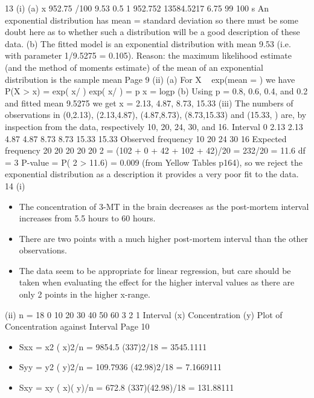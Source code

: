 \documentclass[a4paper,12pt]{article}
\begin{document}
13 (i) (a) x 952.75 /100 9.53
0.5
1 952.752
13584.5217 6.75
99 100
s
An exponential distribution has mean = standard deviation so there
must be some doubt here as to whether such a distribution will be a
good description of these data.
(b) The fitted model is an exponential distribution with mean 9.53
(i.e. with parameter 1/9.5275 = 0.105).
Reason: the maximum likelihood estimate (and the method of
moments estimate) of the mean of an exponential distribution is the
sample mean
Page 9
(ii) (a) For X ~ exp(mean = ) we have P(X > x) = exp( x/ )
exp( x/ ) = p x = logp
(b) Using p = 0.8, 0.6, 0.4, and 0.2 and fitted mean 9.5275
we get x = 2.13, 4.87, 8.73, 15.33
(iii) The numbers of observations in (0,2.13), (2.13,4.87), (4.87,8.73), (8.73,15.33)
and (15.33, ) are, by inspection from the data, respectively 10, 20, 24, 30,
and 16.
Interval 0 2.13 2.13 4.87 4.87 8.73 8.73 15.33 15.33
Observed frequency 10 20 24 30 16
Expected frequency 20 20 20 20 20
2 = (102 + 0 + 42 + 102 + 42)/20 = 232/20 = 11.6
df = 3
P-value = P( 2 > 11.6) = 0.009 (from Yellow Tables p164), so we reject the
exponential distribution as a description it provides a very poor fit to the
data.
14 (i)
\begin{itemize}
    \item The concentration of 3-MT in the brain decreases as the post-mortem interval increases from 5.5 hours to 60 hours.
    \item There are two points with a much higher post-mortem interval than the other observations.
\item The data seem to be appropriate for linear regression, but care should be taken when evaluating the effect for the higher interval values as there are only 2 points in the higher x-range.
\end{itemize}

(ii) n = 18
0 10 20 30 40 50 60
3
2
1
Interval (x)
Concentration (y)
Plot of Concentration against Interval
Page 10
\begin{itemize}
    \item Sxx = x2 ( x)2/n
= 9854.5 (337)2/18
= 3545.1111
    \item Syy = y2 ( y)2/n
= 109.7936 (42.98)2/18
= 7.1669111
    \item Sxy = xy ( x)( y)/n
= 672.8 (337)(42.98)/18
= 131.88111
\end{itemize}
\end{document}
